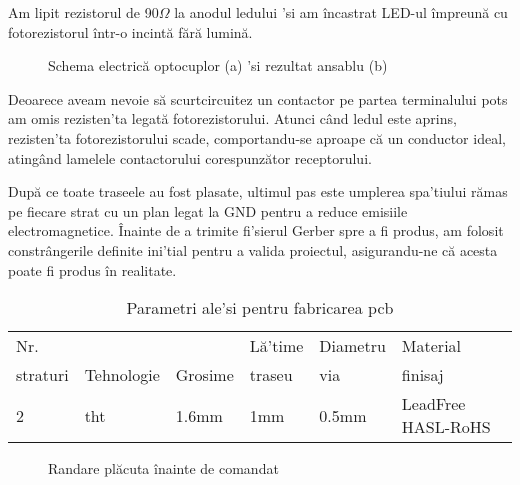 Am lipit rezistorul de 90$\Omega$ la anodul ledului 'si am încastrat LED-ul împreună cu fotorezistorul într-o incintă fără lumină.

\begin{figure}[!ht]
\begin{center}
  \caption{Schema electrică optocuplor (a) 'si rezultat ansablu (b)}
  \label{fig:opto}
\end{center}
\end{figure}


Deoarece aveam nevoie să scurtcircuitez un contactor pe partea terminalului \acrshort{pots} am omis rezisten'ta legată fotorezistorului. Atunci când ledul este aprins, rezisten'ta fotorezistorului scade, comportandu-se aproape că un conductor ideal, atingând lamelele contactorului corespunzător receptorului.

După ce toate traseele au fost plasate, ultimul pas este umplerea spa'tiului rămas pe fiecare strat cu un plan legat la GND pentru a reduce emisiile electromagnetice. Înainte de a trimite fi'sierul Gerber spre a fi produs, am folosit constrângerile definite ini'tial pentru a valida proiectul, asigurandu-ne că acesta poate fi produs în realitate.

\begin{table}[ht!]
\begin{tabular}{llllll}
\hline
Nr. &  &  & Lă'time & Diametru & Material \\ 
straturi & Tehnologie & Grosime & traseu & via & finisaj \\
\hline
\hline
2 & \acrshort{tht} & 1.6mm & 1mm & 0.5mm & LeadFree HASL-RoHS\\
\hline
\end{tabular}
\centering
\caption{Parametri ale'si pentru fabricarea \acrshort{pcb}}
\label{tab:params}
\end{table}

\begin{figure}[!ht]
\begin{center}
  \caption{Randare plăcuta înainte de comandat}
  \label{fig:hat}
\end{center}
\end{figure}

